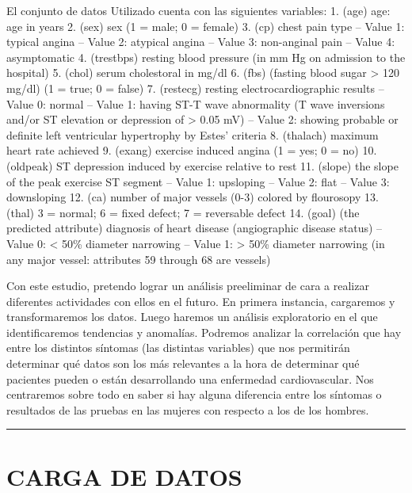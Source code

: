 \documentclass[
]{article}
\begin{document}
El conjunto de datos Utilizado cuenta con las siguientes variables: 1.
(age) age: age in years 2. (sex) sex (1 = male; 0 = female) 3. (cp)
chest pain type -- Value 1: typical angina -- Value 2: atypical angina
-- Value 3: non-anginal pain -- Value 4: asymptomatic 4. (trestbps)
resting blood pressure (in mm Hg on admission to the hospital) 5. (chol)
serum cholestoral in mg/dl 6. (fbs) (fasting blood sugar \textgreater{}
120 mg/dl) (1 = true; 0 = false) 7. (restecg) resting
electrocardiographic results -- Value 0: normal -- Value 1: having ST-T
wave abnormality (T wave inversions and/or ST elevation or depression of
\textgreater{} 0.05 mV) -- Value 2: showing probable or definite left
ventricular hypertrophy by Estes' criteria 8. (thalach) maximum heart
rate achieved 9. (exang) exercise induced angina (1 = yes; 0 = no) 10.
(oldpeak) ST depression induced by exercise relative to rest 11. (slope)
the slope of the peak exercise ST segment -- Value 1: upsloping -- Value
2: flat -- Value 3: downsloping 12. (ca) number of major vessels (0-3)
colored by flourosopy 13. (thal) 3 = normal; 6 = fixed defect; 7 =
reversable defect 14. (goal) (the predicted attribute) diagnosis of
heart disease (angiographic disease status) -- Value 0: \textless{} 50\%
diameter narrowing -- Value 1: \textgreater{} 50\% diameter narrowing
(in any major vessel: attributes 59 through 68 are vessels)

Con este estudio, pretendo lograr un análisis preeliminar de cara a
realizar diferentes actividades con ellos en el futuro. En primera
instancia, cargaremos y transformaremos los datos. Luego haremos un
análisis exploratorio en el que identificaremos tendencias y anomalías.
Podremos analizar la correlación que hay entre los distintos síntomas
(las distintas variables) que nos permitirán determinar qué datos son
los más relevantes a la hora de determinar qué pacientes pueden o están
desarrollando una enfermedad cardiovascular. Nos centraremos sobre todo
en saber si hay alguna diferencia entre los síntomas o resultados de las
pruebas en las mujeres con respecto a los de los hombres.

\begin{center}\rule{0.5\linewidth}{0.5pt}\end{center}

\hypertarget{carga-de-datos}{%
\section{CARGA DE DATOS}\label{carga-de-datos}}
\end{document}
